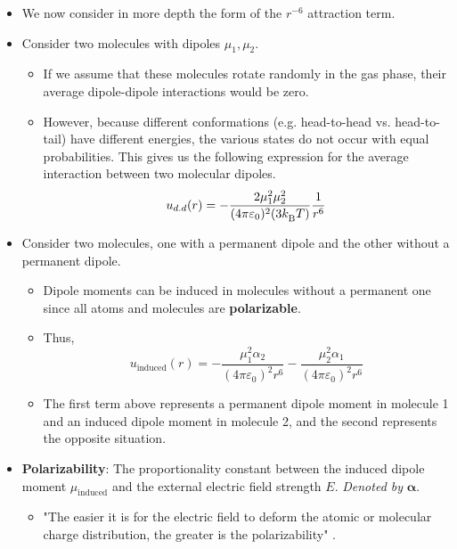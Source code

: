 \documentclass[../notes.tex]{subfiles}
\begin{document}
\begin{itemize}
\begin{itemize}
    \end{itemize}
    \item We now consider in more depth the form of the $r^{-6}$ attraction term.
    \item Consider two molecules with dipoles $\mu_1,\mu_2$.
    \begin{itemize}
        \item If we assume that these molecules rotate randomly in the gas phase, their average dipole-dipole interactions would be zero.
        \item However, because different conformations (e.g. head-to-head vs. head-to-tail) have different energies, the various states do not occur with equal probabilities. This gives us the following expression for the average interaction between two molecular dipoles.
        \begin{equation*}
            u_{d.d}(r) = -\frac{2\mu_1^2\mu_2^2}{(4\pi\varepsilon_0)^2(3{k_\text{B}^{}} T)}\frac{1}{r^6}
        \end{equation*}
    \end{itemize}
    \item Consider two molecules, one with a permanent dipole and the other without a permanent dipole.
    \begin{itemize}
        \item Dipole moments can be induced in molecules without a permanent one since all atoms and molecules are \textbf{polarizable}.
        \item Thus,
        \begin{equation*}
            u_\text{induced}(r) = -\frac{\mu_1^2\alpha_2}{(4\pi\varepsilon_0)^2r^6}-\frac{\mu_2^2\alpha_1}{(4\pi\varepsilon_0)^2r^6}
        \end{equation*}
        \item The first term above represents a permanent dipole moment in molecule 1 and an induced dipole moment in molecule 2, and the second represents the opposite situation.
    \end{itemize}
    \item \textbf{Polarizability}: The proportionality constant between the induced dipole moment $\mu_\text{induced}$ and the external electric field strength $E$. \emph{Denoted by} $\bm{\alpha}$.
    \begin{itemize}
        \item "The easier it is for the electric field to deform the atomic or molecular charge distribution, the greater is the polarizability" \parencite[667-68]{bib:McQuarrieSimon}.

\end{itemize}
\end{itemize}
\end{document}
